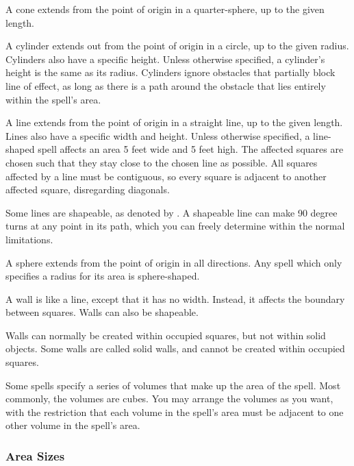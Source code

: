              A cone extends from the point of origin in a quarter-sphere, up to the given length.

             A cylinder extends out from the point of origin in a circle, up to the given radius.
            Cylinders also have a specific height.
            Unless otherwise specified, a cylinder's height is the same as its radius.
            Cylinders ignore obstacles that partially block line of effect, as long as there is a path around the obstacle that lies entirely within the spell's area.

             A line extends from the point of origin in a straight line, up to the given length.
            Lines also have a specific width and height.
            Unless otherwise specified, a line-shaped spell affects an area 5 feet wide and 5 feet high.
            The affected squares are chosen such that they stay close to the chosen line as possible.
            All squares affected by a line must be contiguous, so every square is adjacent to another affected square, disregarding diagonals.

            \label{Shapeable} Some lines are shapeable, as denoted by \shapeable.
            A shapeable line can make 90 degree turns at any point in its path, which you can freely determine within the normal limitations.

             A sphere extends from the point of origin in all directions.
            Any spell which only specifies a radius for its area is sphere-shaped.

             A wall is like a line, except that it has no width.
            Instead, it affects the boundary between squares.
            Walls can also be shapeable.

            Walls can normally be created within occupied squares, but not within solid objects.
            Some walls are called solid walls, and cannot be created within occupied squares.

             Some spells specify a series of volumes that make up the area of the spell.
            Most commonly, the volumes are cubes.
            You may arrange the volumes as you want, with the restriction that each volume in the spell's area must be adjacent to one other volume in the spell's area.

        \subsubsection{Area Sizes}

